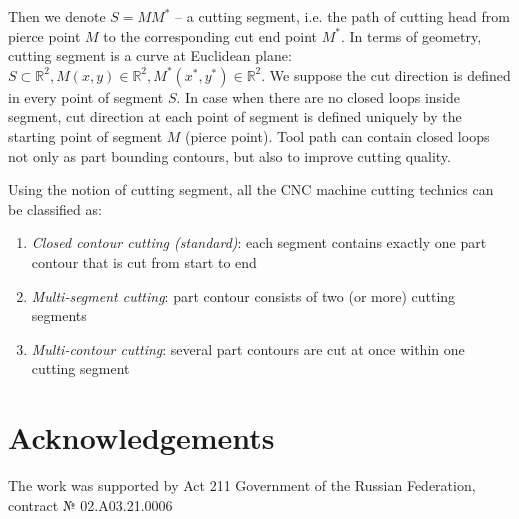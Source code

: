 \documentclass{../download/tPRS2e}
\begin{document}
Then we denote $S=MM^*$ -- a cutting segment,
i.e. the path of cutting head
from pierce point $M$
to the corresponding cut end point $M^*$.
In terms of geometry,
cutting segment is a curve at Euclidean plane:
$S \subset \mathbb R^2,
M(x,y) \in \mathbb R^2,
M^*(x^*,y^*) \in \mathbb R^2$.
We suppose
the cut direction is defined
in every point of segment $S$.
In case when there are no
closed loops inside segment,
cut direction at each point of segment
is defined uniquely by the starting
point of segment $M$
(pierce point).
Tool path can contain closed loops
not only as part bounding contours,
but also to improve cutting quality.

Using the notion of cutting segment,
all the CNC machine cutting technics
can be classified as:
\begin{enumerate}
    \item{\textit{Closed contour cutting (standard)}}:
    each segment contains exactly one part contour
    that is cut from start to end
    \item{\textit{Multi-segment cutting}}:
    part contour consists of two (or more) cutting segments
    \item{\textit{Multi-contour cutting}}:
    several part contours are cut at once within one cutting segment
\end{enumerate}

\section*{Acknowledgements}

The work was supported by Act 211 Government of the Russian Federation, contract № 02.A03.21.0006


\nocite{*}

\end{document}
